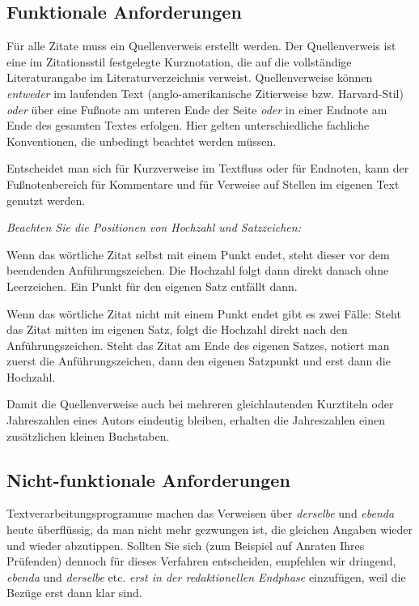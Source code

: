 \subsection{Funktionale Anforderungen}
Für alle Zitate muss ein Quellenverweis erstellt werden. Der Quellenverweis ist eine im Zitationsstil festgelegte Kurznotation, die auf die vollständige Literaturangabe im Literaturverzeichnis verweist. Quellenverweise können \emph{entweder} im laufenden Text (anglo-amerikanische Zitierweise bzw. Harvard-Stil) \emph{oder} über eine Fußnote am unteren Ende der Seite \emph{oder} in einer Endnote am Ende des gesamten Textes erfolgen. Hier gelten unterschiedliche fachliche Konventionen, die unbedingt beachtet werden müssen.
\par
Entscheidet man sich für Kurzverweise im Textfluss oder für Endnoten, kann der Fußnotenbereich für Kommentare und für Verweise auf Stellen im eigenen Text genutzt werden.
\par
\emph{Beachten Sie die Positionen von Hochzahl und Satzzeichen:}
\par
Wenn das wörtliche Zitat selbst mit einem Punkt endet, steht dieser vor dem beendenden Anführungszeichen. Die Hochzahl folgt dann direkt danach ohne Leerzeichen. Ein Punkt für den eigenen Satz entfällt dann.
\par
Wenn das wörtliche Zitat nicht mit einem Punkt endet gibt es zwei Fälle: Steht das Zitat mitten im eigenen Satz, folgt die Hochzahl direkt nach den Anführungszeichen. Steht das Zitat am Ende des eigenen Satzes, notiert man zuerst die Anführungszeichen, dann den eigenen Satzpunkt und erst dann die Hochzahl.
\par
Damit die Quellenverweise auch bei mehreren gleichlautenden Kurztiteln oder Jahreszahlen eines Autors eindeutig bleiben, erhalten die Jahreszahlen einen zusätzlichen kleinen Buchstaben.
%
\subsection{Nicht-funktionale Anforderungen}
Textverarbeitungsprogramme machen das Verweisen über \emph{derselbe} und \emph{ebenda} heute überflüssig, da man nicht mehr gezwungen ist, die gleichen Angaben wieder und wieder abzutippen. Sollten Sie sich (zum Beispiel auf Anraten Ihres Prüfenden) dennoch für dieses Verfahren entscheiden, empfehlen wir dringend, \emph{ebenda} und \emph{derselbe} etc. \emph{erst in der redaktionellen Endphase} einzufügen, weil die Bezüge erst dann klar sind.
%
